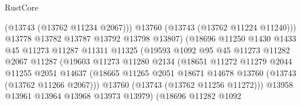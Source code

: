 \begin{lexlean}{RustCore}
\begin{coremodule}
                                        (@13743 (@13762 @11234 @2067)))
                                      @13760
                                      (@13743 (@13762 @11224 @11240)))
                                    @13778
                                    @13782
                                    @13787
                                    @13792
                                    @13798
                                    @13807)
                                  (@18696
                                    @11250
                                    @1430
                                    @1433
                                    @45
                                    @11273
                                    @11287
                                    @11311
                                    @11325
                                    (@19593
                                      @1092
                                      @95
                                      @45
                                      @11273
                                      @11282
                                      @2067
                                      @11287
                                      (@19603
                                        @11273
                                        @11280
                                        @2134
                                        (@18651
                                          @11272
                                          @11279
                                          @2044
                                          @11255
                                          @2051
                                          @14637
                                          (@18665
                                            @11265
                                            @2051
                                            @18671
                                            @14678
                                            @13760
                                            (@13743 (@13762 @11266 @2067)))
                                          @13760
                                          (@13743 (@13762 @11256 @11272)))
                                        @13958
                                        @13961
                                        @13964
                                        @13968
                                        @13973
                                        @13979)
                                      (@18696
                                        @11282
                                        @1092

\end{coremodule}
\end{lexlean}
